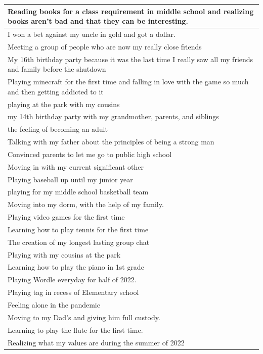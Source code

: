 \documentclass[
  .7em,
  letterpaper,
  DIV=11,
  numbers=noendperiod]{scrartcl}
\begin{document}
\begin{table}
\begin{tabular}{l}
\hline
Reading books for a class requirement in middle school and realizing books aren't bad and that they can be interesting.\\
\hline
I won a bet against my uncle in gold and got a dollar.\\
\hline
Meeting a group of people who are now my really close friends\\
\hline
My 16th birthday party because it was the last time I really saw all my friends and family before the shutdown\\
\hline
Playing minecraft for the first time and falling in love with the game so much and then getting addicted to it\\
\hline
playing at the park with my cousins\\
\hline
my 14th birthday party with my grandmother, parents, and siblings\\
\hline
the feeling of becoming an adult\\
\hline
Talking with my father about the principles of being a strong man\\
\hline
Convinced parents to let me go to public high school\\
\hline
Moving in with my current significant other\\
\hline
Playing baseball up until my junior year\\
\hline
playing for my middle school basketball team\\
\hline
Moving into my dorm, with the help of my family.\\
\hline
Playing video games for the first time\\
\hline
Learning how to play tennis for the first time\\
\hline
The creation of my longest lasting group chat\\
\hline
Playing with my cousins at the park\\
\hline
Learning how to play the piano in 1st grade\\
\hline
Playing Wordle everyday for half of 2022.\\
\hline
Playing tag in recess of Elementary school\\
\hline
Feeling alone in the pandemic\\
\hline
Moving to my Dad's and giving him full custody.\\
\hline
Learning to play the flute for the first time.\\
\hline
Realizing what my values are during the summer of 2022\\
\hline

\end{tabular}
\end{table}
\end{document}
